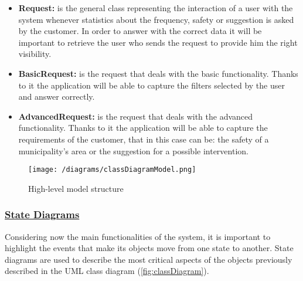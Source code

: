 \begin{itemize}
		\item \textbf{Request:} is the general class representing the interaction of a user with the system whenever statistics about the frequency, safety or suggestion is asked by the customer. In order to answer with the correct data it will be important to retrieve the user who sends the request to provide him the right visibility.
		
		\item \textbf{BasicRequest:} is the request that deals with the basic functionality. Thanks to it the application will be able to capture the filters selected by the user and answer correctly.
		
		\item \textbf{AdvancedRequest:} is the request that deals with the advanced functionality. Thanks to it the application will be able to capture the requirements of the customer, that in this case can be: the safety of a municipality's area or the suggestion for a possible intervention.
	\end{itemize}
	
	\begin{figure}[h!]
		\centering
		\texttt{[image: /diagrams/classDiagramModel.png]}
		\caption{\label{fig:classDiagram}High-level model structure}
	\end{figure}

	\FloatBarrier
	
	\subsubsection[State Diagrams]{\hyperlink{toc}{State Diagrams}}
	Considering now the main functionalities of the system, it is important to highlight the events that make its objects move from one state to another. State diagrams are used to describe the most critical aspects of the objects previously described in the UML class diagram (\autoref{fig:classDiagram}).
	
